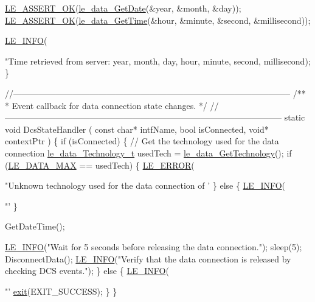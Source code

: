 \begin{DoxyCodeInclude}
{{{{    \hyperlink{le__log_8h_a7cd2daa3d4af1de4d29e0eed95187484}{LE\_ASSERT\_OK}(\hyperlink{le__data__interface_8h_a02a43ab1a3b9aef7e170214ffeb48907}{le\_data\_GetDate}(&year, &month, &day));
    \hyperlink{le__log_8h_a7cd2daa3d4af1de4d29e0eed95187484}{LE\_ASSERT\_OK}(\hyperlink{le__data__interface_8h_afdd17e6659e60b1510fe54c23a022960}{le\_data\_GetTime}(&hour, &minute, &second, &millisecond));

    \hyperlink{le__log_8h_a23e6d206faa64f612045d688cdde5808}{LE\_INFO}(\textcolor{stringliteral}{"Time retrieved from server: %
            year, month, day, hour, minute, second, millisecond);
\}

\textcolor{comment}{//--------------------------------------------------------------------------------------------------}\textcolor{comment}{}
\textcolor{comment}{/**}
\textcolor{comment}{ *  Event callback for data connection state changes.}
\textcolor{comment}{ */}
\textcolor{comment}{//--------------------------------------------------------------------------------------------------}
\textcolor{keyword}{static} \textcolor{keywordtype}{void} DcsStateHandler
(
    \textcolor{keyword}{const} \textcolor{keywordtype}{char}* intfName,
    \textcolor{keywordtype}{bool} isConnected,
    \textcolor{keywordtype}{void}* contextPtr
)
\{
    \textcolor{keywordflow}{if} (isConnected)
    \{
        \textcolor{comment}{// Get the technology used for the data connection}
        \hyperlink{le__data__interface_8h_a245d12b4d3367d81c0fc8b76fa60674a}{le\_data\_Technology\_t} usedTech = 
      \hyperlink{le__data__interface_8h_a76b66fd017a52db01fcc46a5fcd2f54b}{le\_data\_GetTechnology}();
        \textcolor{keywordflow}{if} (\hyperlink{le__data__interface_8h_a245d12b4d3367d81c0fc8b76fa60674aa5143acc7e16842ac4cf33afa34b50c0b}{LE\_DATA\_MAX} == usedTech)
        \{
            \hyperlink{le__log_8h_a353590f91b3143a7ba3a416ae5a50c3d}{LE\_ERROR}(\textcolor{stringliteral}{"Unknown technology used for the data connection of '%
        \}
        \textcolor{keywordflow}{else}
        \{
            \hyperlink{le__log_8h_a23e6d206faa64f612045d688cdde5808}{LE\_INFO}(\textcolor{stringliteral}{"'%
        \}

        GetDateTime();

        \hyperlink{le__log_8h_a23e6d206faa64f612045d688cdde5808}{LE\_INFO}(\textcolor{stringliteral}{"Wait for 5 seconds before releasing the data connection."});
        sleep(5);
        DisconnectData();
        \hyperlink{le__log_8h_a23e6d206faa64f612045d688cdde5808}{LE\_INFO}(\textcolor{stringliteral}{"Verify that the data connection is released by checking DCS events."});
    \}
    \textcolor{keywordflow}{else}
    \{
        \hyperlink{le__log_8h_a23e6d206faa64f612045d688cdde5808}{LE\_INFO}(\textcolor{stringliteral}{"'%
        \hyperlink{app_stop_client_8c_a310220604a584e112ba8f7aa3dfe23f1}{exit}(EXIT\_SUCCESS);
    \}
\}

}}}}}}}}
\end{DoxyCodeInclude}
